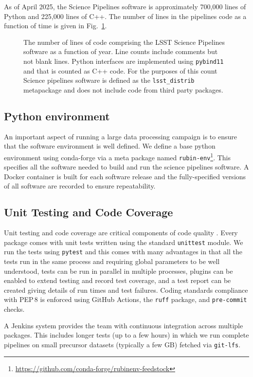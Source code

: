 As of April 2025, the Science Pipelines software is approximately 700,000 lines of Python and 225,000 lines of C++.
The number of lines in the pipelines code as a function of time is given in Fig.~\ref{fig:pipe-loc}.

\begin{figure}
\caption{The number of lines of code comprising the LSST Science Pipelines software as a function of year.
Line counts include comments but not blank lines. Python interfaces are implemented using \texttt{pybind11} and that is counted as C++ code. For the purposes of this count Science pipelines software is defined as the \texttt{lsst\_distrib} metapackage and does not include code from third party packages.}
\label{fig:pipe-loc}
\end{figure}

\subsection{Python environment}

An important aspect of running a large data processing campaign is to ensure that the software environment is well defined.
We define a base python environment using conda-forge via a meta package named \texttt{rubin-env}\footnote{\url{https://github.com/conda-forge/rubinenv-feedstock}}.
This specifies all the software needed to build and run the science pipelines software.
A Docker container is built for each software release and the fully-specified versions of all software are recorded to ensure repeatability.

\subsection{Unit Testing and Code Coverage}

Unit testing and code coverage are critical components of code quality \citep{2018SPIE10707E..09J}.
Every package comes with unit tests written using the standard \texttt{unittest} module.
We run the tests using \texttt{pytest} \citep{pytest} and this comes with many advantages in that all the tests run in the same process and requiring global parameters to be well understood, tests can be run in parallel in multiple processes, plugins can be enabled to extend testing and record test coverage, and a test report can be created giving details of run times and test failures.
Coding standards compliance with PEP\,8 \citep{pep8} is enforced using GitHub Actions, the \texttt{ruff} package, and \texttt{pre-commit} checks.

A Jenkins system provides the team with continuous integration across multiple packages.
This includes longer tests (up to a few hours) in which we run complete pipelines on small precursor datasets (typically a few GB) fetched via \texttt{git-lfs}.
